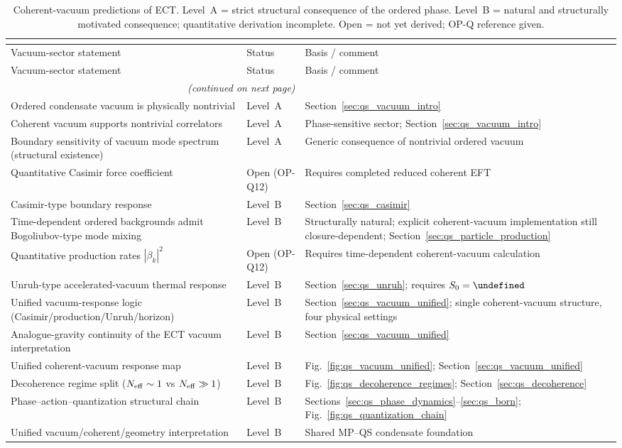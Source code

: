 \documentclass[11pt,a4paper]{article}
\let\hbar\undefined
\numberwithin{equation}{section}
\begin{document}
\begin{longtable}{p{6.0cm}p{2.4cm}p{4.5cm}}
\caption{Coherent-vacuum predictions of ECT.
Level~A = strict structural consequence of the ordered phase.
Level~B = natural and structurally motivated consequence; quantitative
derivation incomplete.
Open = not yet derived; OP-Q reference given.} \\
\label{tab:qs_vacuum} \\[-6pt]
\toprule
Vacuum-sector statement & Status & Basis / comment \\
\midrule
\endfirsthead
\toprule
Vacuum-sector statement & Status & Basis / comment \\
\midrule
\endhead
\midrule\multicolumn{2}{r}{\small\textit{(continued on next page)}}\\
\endfoot
\bottomrule
\endlastfoot
Ordered condensate vacuum is physically nontrivial
  & Level~A
  & Section~\ref{sec:qs_vacuum_intro} \\
Coherent vacuum supports nontrivial correlators
  & Level~A
  & Phase-sensitive sector; Section~\ref{sec:qs_vacuum_intro} \\
Boundary sensitivity of vacuum mode spectrum
  (structural existence)
  & Level~A
  & Generic consequence of nontrivial ordered vacuum \\
Quantitative Casimir force coefficient
  & Open (OP-Q12)
  & Requires completed reduced coherent EFT \\
Casimir-type boundary response
  & Level~B
  & Section~\ref{sec:qs_casimir} \\
Time-dependent ordered backgrounds admit Bogoliubov-type mode mixing
  & Level~B
  & Structurally natural; explicit coherent-vacuum
    implementation still closure-dependent;
    Section~\ref{sec:qs_particle_production} \\
Quantitative production rates $|\beta_k|^2$
  & Open (OP-Q12)
  & Requires time-dependent coherent-vacuum calculation \\
Unruh-type accelerated-vacuum thermal response
  & Level~B
  & Section~\ref{sec:qs_unruh}; requires $S_0=\hbar$ \\
Unified vacuum-response logic (Casimir/production/Unruh/horizon)
  & Level~B
  & Section~\ref{sec:qs_vacuum_unified};
    single coherent-vacuum structure, four physical settings \\
Analogue-gravity continuity of the ECT vacuum interpretation
  & Level~B
  & Section~\ref{sec:qs_vacuum_unified} \\
Unified coherent-vacuum response map
  & Level~B
  & Fig.~\ref{fig:qs_vacuum_unified};
    Section~\ref{sec:qs_vacuum_unified} \\
Decoherence regime split ($N_{\rm eff}\sim1$ vs $N_{\rm eff}\gg1$)
  & Level~B
  & Fig.~\ref{fig:qs_decoherence_regimes};
    Section~\ref{sec:qs_decoherence} \\
Phase--action--quantization structural chain
  & Level~B
  & Sections~\ref{sec:qs_phase_dynamics}--\ref{sec:qs_born};
    Fig.~\ref{fig:qs_quantization_chain} \\
Unified vacuum/coherent/geometry interpretation
  & Level~B
  & Shared MP--QS condensate foundation \\

\end{longtable}
\end{document}

